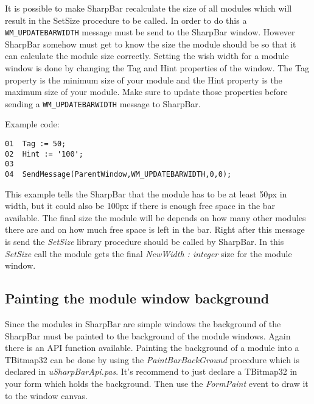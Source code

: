 \documentclass[a4paper]{article}
\begin{document}
    It is possible to make SharpBar recalculate the size of all modules which will result in the SetSize procedure to be called. In order to do this a \verb+WM_UPDATEBARWIDTH+ message must be send to the SharpBar window. However SharpBar somehow must get to know the size the module should be so that it can calculate the module size correctly.
    Setting the wish width for a module window is done by changing the Tag and Hint properties of the window. The Tag property is the minimum size of your module and the Hint property is the maximum size of your module. Make sure to update those properties before sending a \verb+WM_UPDATEBARWIDTH+ message to SharpBar. 

    Example code: 
    \begin{verbatim}
01  Tag := 50;
02  Hint := '100';
03  
04  SendMessage(ParentWindow,WM_UPDATEBARWIDTH,0,0);
   \end{verbatim}

    This example tells the SharpBar that the module has to be at least 50px in width, but it could also be 100px if there is enough free space in the bar available. The final size the module will be depends on how many other modules there are and on how much free space is left in the bar. Right after this message is send the {\it SetSize} library procedure should be called by SharpBar. In this {\it SetSize} call the module gets the final {\it NewWidth : integer} size for the module window.  
  \newpage
  \subsection{Painting the module window background}
    Since the modules in SharpBar are simple windows the background of the SharpBar must be painted to the background of the module windows. Again there is an API function available. Painting the background of a module into a TBitmap32 can be done by using the {\it PaintBarBackGround} procedure which is declared in {\it uSharpBarApi.pas}. It's recommend to just declare a TBitmap32 in your form which holds the background. Then use the {\it FormPaint} event to draw it to the window canvas. 
\end{document}
